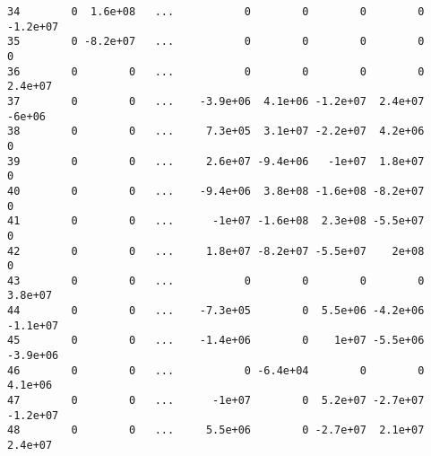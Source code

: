 \documentclass{article}
\begin{document}
\begin{verbatim}
34        0  1.6e+08   ...           0        0        0        0 -1.2e+07   
35        0 -8.2e+07   ...           0        0        0        0        0   
36        0        0   ...           0        0        0        0  2.4e+07   
37        0        0   ...    -3.9e+06  4.1e+06 -1.2e+07  2.4e+07   -6e+06   
38        0        0   ...     7.3e+05  3.1e+07 -2.2e+07  4.2e+06        0   
39        0        0   ...     2.6e+07 -9.4e+06   -1e+07  1.8e+07        0   
40        0        0   ...    -9.4e+06  3.8e+08 -1.6e+08 -8.2e+07        0   
41        0        0   ...      -1e+07 -1.6e+08  2.3e+08 -5.5e+07        0   
42        0        0   ...     1.8e+07 -8.2e+07 -5.5e+07    2e+08        0   
43        0        0   ...           0        0        0        0  3.8e+07   
44        0        0   ...    -7.3e+05        0  5.5e+06 -4.2e+06 -1.1e+07   
45        0        0   ...    -1.4e+06        0    1e+07 -5.5e+06 -3.9e+06   
46        0        0   ...           0 -6.4e+04        0        0  4.1e+06   
47        0        0   ...      -1e+07        0  5.2e+07 -2.7e+07 -1.2e+07   
48        0        0   ...     5.5e+06        0 -2.7e+07  2.1e+07  2.4e+07   


\end{verbatim}
\end{document}

